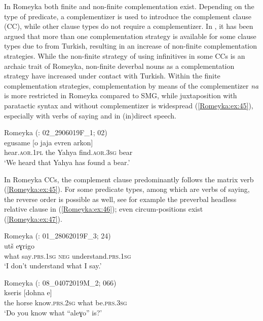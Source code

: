 \documentclass[output=paper,colorlinks,citecolor=brown]{langscibook}
\begin{document}
In Romeyka both finite and non-finite complementation exist. Depending on the type of predicate, a complementizer is used to introduce the complement clause (CC), while other clause types do not require a complementizer. In \citet[ 278]{schreibergrammar2022}, it has been argued that more than one complementation strategy is available for some clause types due to  from Turkish, resulting in an increase of non-finite complementation strategies. While the non-finite strategy of using infinitives in some CCs is an archaic trait of Romeyka, non-finite deverbal nouns as a complementation strategy have increased under contact with Turkish. Within the finite complementation strategies, complementation by means of the complementizer \textit{na} is more restricted in Romeyka compared to SMG, while juxtaposition with paratactic syntax and without complementizer is widespread (\ref{Romeyka:ex:45}), especially with verbs of saying and in (in)direct speech. 

\ea\label{Romeyka:ex:45}
Romeyka (\citealt{schreiber_inprep}: 02\_2906019F\_1; 02) \\
\gll egusame [o jaja evren arkon] \\
hear\textsc{.aor.1pl} the Yahya find\textsc{.aor.3sg} bear \\
\glt `We heard that Yahya has found a bear.'  \\
\z

In Romeyka CCs, the complement clause predominantly follows the matrix verb (\ref{Romeyka:ex:45}). For some predicate types, among which are verbs of saying, the reverse order is possible as well, see for example the preverbal headless relative clause in (\ref{Romeyka:ex:46}); even circum-positions exist (\ref{Romeyka:ex:47}).

\ea\label{Romeyka:ex:46}
Romeyka (\citealt{schreiber_inprep}: 01\_28062019F\_3; 24) \\
\gll [to leɣo] utš eɣrigo \\
what say\textsc{.prs.1sg} \textsc{neg} understand\textsc{.prs.1sg} \\
\glt `I don't understand what I say.'  \\
\z

\ea\label{Romeyka:ex:47}
Romeyka (\citealt{schreiber_inprep}: 08\_04072019M\_2; 066) \\
\gll [t aleɣo] kseris [dohna e] \\
the horse know\textsc{.prs.2sg} what be\textsc{.prs.3sg} \\
\glt `Do you know what ``aleɣo'' is?'
\z
\end{document}

